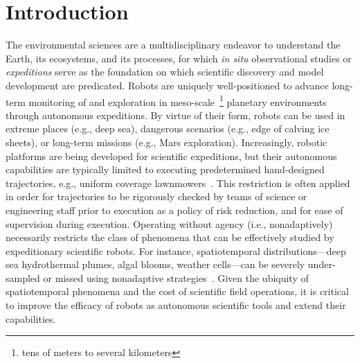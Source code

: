 \chapter{Introduction}


The environmental sciences are a multidisciplinary endeavor to understand the Earth, its ecosystems, and its processes, for which \emph{in situ} observational studies or \emph{expeditions} serve as the foundation on which scientific discovery and model development are predicated.
Robots are uniquely well-positioned to advance long-term monitoring of and exploration in meso-scale~\footnote{tens of meters to several kilometers} planetary environments through autonomous expeditions.
By virtue of their form, robots can be used in extreme places (e.g., deep sea), dangerous scenarios (e.g., edge of calving ice sheets), or long-term missions (e.g., Mars exploration). Increasingly, robotic platforms are being developed for scientific expeditions, but their autonomous capabilities are typically limited to executing predetermined hand-designed trajectories, e.g., uniform coverage lawnmowers~\autocite{camilli2010tracking}.
This restriction is often applied in order for trajectories to be rigorously checked by teams of science or engineering staff prior to execution as a policy of risk reduction, and for ease of supervision during execution.
Operating without agency (i.e., nonadaptively) necessarily restricts the class of phenomena that can be effectively studied by expeditionary scientific robots.
For instance, spatiotemporal distributions---deep sea hydrothermal plumes, algal blooms, weather cells---can be severely under-sampled or missed using nonadaptive strategies~\autocite{flaspohler2019information}.
Given the ubiquity of spatiotemporal phenomena and the cost of scientific field operations, it is critical to improve the efficacy of robots as autonomous scientific tools and extend their capabilities.

